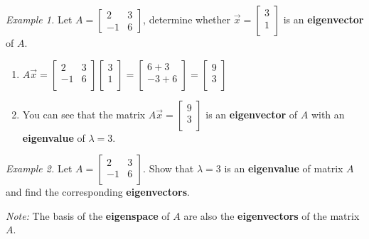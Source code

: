 \documentclass[12pt, letterpaper]{article}
\begin{document}
\textit{Example 1.} Let $ A =
\begin{bmatrix}
  2 & 3 \\
  -1 & 6 \end {bmatrix} $, determine whether $ \vec{x} =
  \begin{bmatrix}
    3 \\ 1 \\
  \end{bmatrix} $ is an \textbf{eigenvector} of $ A $.

  \begin{enumerate}
    \item $ A \vec{x} =
      \begin{bmatrix}
        2 & 3 \\
        -1 & 6 \\
      \end{bmatrix}
      \begin{bmatrix}
        3 \\ 1 \\
      \end{bmatrix} =
      \begin{bmatrix}
        6 + 3 \\
        -3 + 6 \\
      \end{bmatrix} =
      \begin{bmatrix}
        9 \\ 3 \\
      \end{bmatrix} $
    \item You can see that the matrix $ A\vec{x} =
      \begin{bmatrix}
        9 \\ 3 \\
      \end{bmatrix} $ is an \textbf{eigenvector} of $ A $ with an
      \textbf{eigenvalue} of $ \lambda = 3 $.
  \end{enumerate}

  \bigskip

  \textit{Example 2.} Let $ A =
  \begin{bmatrix}
    2 & 3 \\
    -1 & 6 \\
  \end{bmatrix} $. Show that $ \lambda = 3 $ is an
  \textbf{eigenvalue} of matrix $ A $ and find the corresponding
  \textbf{eigenvectors}.
  \bigskip

  \textit{Note:} The basis of the \textbf{eigenspace} of $ A $ are
  also the \textbf{eigenvectors} of the matrix $ A $.
\end{document}
